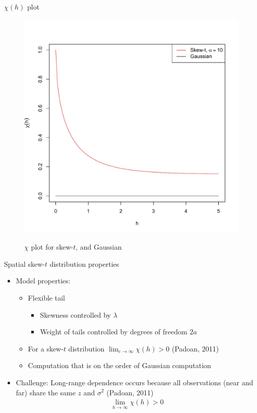 \documentclass{beamer}
\begin{document}
\begin{frame}{$\chi(h)$ plot}
  \vspace{-2em}
  \centering
  \begin{figure}
  \includegraphics[width=.65\linewidth]{./plots/pot/chi-h-t_and_gaus.pdf}\\[-0.2in]
  \caption{$\chi$ plot for skew-$t$, and Gaussian}
  \end{figure}
\end{frame}

\begin{frame}{Spatial skew-$t$ distribution properties}
  \begin{itemize} \setlength{\itemsep}{1em}
    \item Model properties: \vspace{0.5em}
    \begin{itemize} \setlength{\itemsep}{0.5em}
      \item Flexible tail
      \begin{itemize}
        \item Skewness controlled by $\lambda$
        \item Weight of tails controlled by degrees of freedom $2a$
      \end{itemize}
      \item For a skew-$t$ distribution $\lim_{c \rightarrow \infty} \chi(h) > 0$ (Padoan, 2011)
      \item Computation that is on the order of Gaussian computation
    \end{itemize}
    \item Challenge: Long-range dependence occurs because all observations (near and far) share the same $z$ and $\sigma^2$ (Padoan, 2011)
    \begin{align*}
      \lim_{h \rightarrow \infty} \chi(h) > 0
    \end{align*}
  \end{itemize}
\end{frame}
\end{document}
